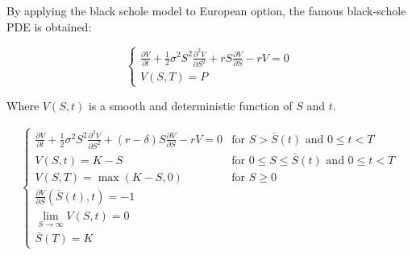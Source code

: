By applying the black schole model to European option, the famous black-schole 
PDE is obtained:

\begin{equation}
  \begin{cases}
    \frac{\partial{V}}{\partial{t}} + \frac{1}{2}\sigma^{2} S^2 \frac{\partial^2{V}}{\partial{S^2}} + r S \frac{\partial{V}}{\partial{S}} - rV = 0 \\
    V(S, T) = P
  \end{cases}
\end{equation}

Where $V(S,t)$ is a smooth and deterministic function of $S$ and $t$.

\begin{align}
  \begin{cases}
    \frac{\partial{V}}{\partial{t}} + \frac{1}{2}\sigma^{2} S^2 \frac{\partial^2{V}}{\partial{S^2}} + (r - \delta) S \frac{\partial{V}}{\partial{S}} - rV = 0 & \text{for $S > \bar{S}(t)$ and $0 \le t < T$} \\
    V(S, t) = K - S & \text{for $0 \le S \le \bar{S}(t)$ and $0 \le t < T$} \\
    V(S, T) = \max(K - S, 0) & \text{for $S \ge 0$} \\
    \frac{\partial{V}}{\partial{S}}(\bar{S}(t), t) = -1 \\
    \lim_{S\rightarrow \infty} V(S, t) = 0 \\
    \bar{S}(T) = K
  \end{cases}
  \label{eq:background:finance:free_boundary_problem}
\end{align}